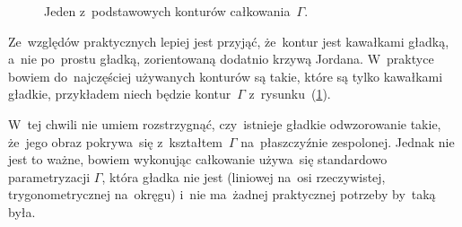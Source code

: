 \documentclass[a4paper,11pt]{article}
\numberwithin{equation}{section}
\begin{document}
\begin{figure}[h]

  \label{fig:Leja-Funkcje-zespolone-01}

  \centering



  \caption{Jeden z~podstawowych konturów całkowania~$\Gamma$.}


\end{figure}





\noindent
{} Ze~względów praktycznych lepiej jest przyjąć, że~kontur jest
kawałkami gładką, a~nie po~prostu gładką, zorientowaną dodatnio krzywą
Jordana. W~praktyce bowiem do~najczęściej używanych konturów są takie,
które są tylko kawałkami gładkie, przykładem niech będzie kontur~$\Gamma$
z~rysunku~(\ref{fig:Leja-Funkcje-zespolone-01}).

W~tej chwili nie umiem rozstrzygnąć, czy~istnieje gładkie odwzorowanie
takie, że~jego obraz pokrywa~się z~kształtem~$\Gamma$ na~płaszczyźnie
zespolonej. Jednak nie jest to ważne, bowiem wykonując całkowanie
używa~się standardowo parametryzacji $\Gamma$, która gładka nie jest
(liniowej na~osi rzeczywistej, trygonometrycznej na~okręgu) i~nie
ma~żadnej praktycznej potrzeby by~taką była.
\end{document}
